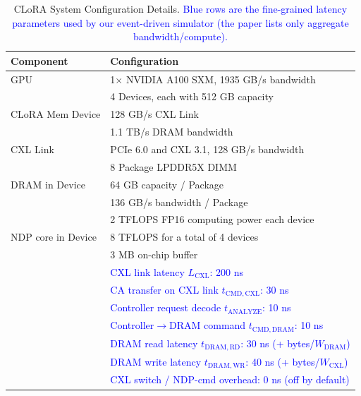 
\begin{table}[t]
\centering
\caption{CLoRA System Configuration Details. \textcolor{blue}{Blue rows are
the fine-grained latency parameters used by our event-driven simulator
(the paper lists only aggregate bandwidth/compute).}}
\label{tab:config}
\small
\begin{tabular}{@{}ll@{}}
\toprule
\textbf{Component} & \textbf{Configuration} \\
\midrule
GPU & 1$\times$ NVIDIA A100 SXM, 1935 GB/s bandwidth \\
\midrule
\multirow{3}{*}{CLoRA Mem Device}
  & 4 Devices, each with 512 GB capacity \\
  & 128 GB/s CXL Link \\
  & 1.1 TB/s DRAM bandwidth \\
\midrule
CXL Link & PCIe 6.0 and CXL 3.1, 128 GB/s bandwidth \\
\midrule
\multirow{3}{*}{DRAM in Device}
  & 8 Package LPDDR5X DIMM \\
  & 64 GB capacity / Package \\
  & 136 GB/s bandwidth / Package \\
\midrule
\multirow{3}{*}{NDP core in Device}
  & 2 TFLOPS FP16 computing power each device \\
  & 8 TFLOPS for a total of 4 devices \\
  & 3 MB on-chip buffer \\
\midrule
\textcolor{blue}{\multirow{7}{*}{Latency parameters}}
  & \textcolor{blue}{CXL link latency $L_{\mathrm{CXL}}$: 200 ns} \\
  & \textcolor{blue}{CA transfer on CXL link $t_{\mathrm{CMD,CXL}}$: 30 ns} \\
  & \textcolor{blue}{Controller request decode $t_{\mathrm{ANALYZE}}$: 10 ns} \\
  & \textcolor{blue}{Controller$\rightarrow$DRAM command $t_{\mathrm{CMD,DRAM}}$: 10 ns} \\
  & \textcolor{blue}{DRAM read latency $t_{\mathrm{DRAM,RD}}$: 30 ns (+ bytes/$W_{\mathrm{DRAM}}$)} \\
  & \textcolor{blue}{DRAM write latency $t_{\mathrm{DRAM,WR}}$: 40 ns (+ bytes/$W_{\mathrm{CXL}}$)} \\
  & \textcolor{blue}{CXL switch / NDP-cmd overhead: 0 ns (off by default)} \\
\bottomrule
\end{tabular}
\end{table}
